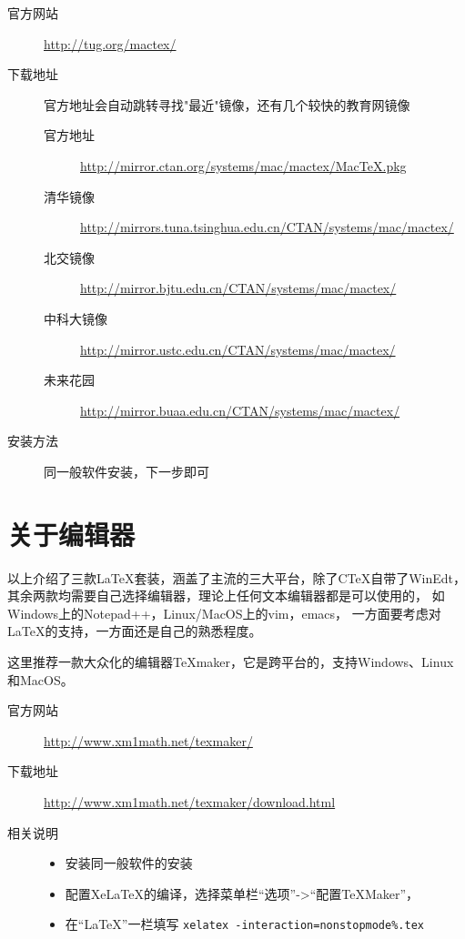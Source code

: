 \begin{description}
    \item[官方网站]
        \url{http://tug.org/mactex/}
    \item[下载地址] 官方地址会自动跳转寻找"最近"镜像，还有几个较快的教育网镜像
    \begin{description}
        \item[官方地址]
            \url{http://mirror.ctan.org/systems/mac/mactex/MacTeX.pkg}
        \item[清华镜像]
            \url{http://mirrors.tuna.tsinghua.edu.cn/CTAN/systems/mac/mactex/}
        \item[北交镜像]
            \url{http://mirror.bjtu.edu.cn/CTAN/systems/mac/mactex/}
        \item[中科大镜像]
            \url{http://mirror.ustc.edu.cn/CTAN/systems/mac/mactex/}
        \item[未来花园]
            \url{http://mirror.buaa.edu.cn/CTAN/systems/mac/mactex/}
    \end{description}
    \item[安装方法] 同一般软件安装，下一步即可
\end{description}

\section{关于编辑器}

以上介绍了三款\LaTeX{}套装，涵盖了主流的三大平台，除了C\TeX{}自带了WinEdt，
其余两款均需要自己选择编辑器，理论上任何文本编辑器都是可以使用的，
如Windows上的Notepad++，Linux/MacOS上的vim，emacs，
一方面要考虑对\LaTeX{}的支持，一方面还是自己的熟悉程度。

这里推荐一款大众化的编辑器\TeX{}maker，它是跨平台的，支持Windows、Linux和MacOS。

\begin{description}
    \item[官方网站]
        \url{http://www.xm1math.net/texmaker/}
    \item[下载地址]
        \url{http://www.xm1math.net/texmaker/download.html}
    \item[相关说明]
    \begin{itemize}
        \item 安装同一般软件的安装
        \item 配置Xe\LaTeX{}的编译，选择菜单栏“选项”->“配置\TeX{}Maker”，
        \item[] 在“\LaTeX{}”一栏填写
            \texttt{xelatex -interaction=nonstopmode\%.tex}
    \end{itemize}
\end{description}

